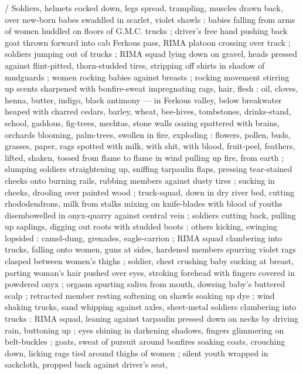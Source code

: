 {\slash} Soldiers, helmets cocked down, legs spread, trampling, muscles drawn back, 
    over new-born babes swaddled in scarlet, violet shawls 
: babies falling from arms of women huddled on floors of G.M.C. trucks 
; driver's free hand pushing back goat thrown forward into cab 
{\semislash} Ferkous pass, RIMA platoon crossing over track 
; soldiers jumping out of trucks 
; RIMA squad lying down on gravel, heads pressed against flint-pitted, 
    thorn-studded tires, stripping off shirts in shadow of mudguards 
; women rocking babies against breasts 
; rocking movement stirring up scents sharpened with bonfire-sweat impregnating rags, hair, flesh 
: oil, cloves, henna, butter, indigo, black antimony 
--- in Ferkous valley, below breakwater heaped with charred cedars, 
    barley, wheat, bee-hives, tombstones, drinks-stand, school, gaddous, fig-trees, mechtas, 
    stone walls oozing spattered with brains, orchards blooming, palm-trees, swollen in fire, 
    exploding 
: flowers, pollen, buds, grasses, paper, rags spotted with milk, with shit, with blood, fruit-peel, 
    feathers, lifted, shaken, tossed from flame to flame in wind pulling up fire, from earth 
; slumping soldiers straightening up, sniffing tarpaulin flaps, 
    pressing tear-stained cheeks onto burning rails, rubbing members against dusty tires 
; sucking in cheeks, drooling over painted wood 
; truck-squad, down in dry river bed, cutting rhododendrons, milk from stalks mixing on 
    knife-blades with blood of youths disembowelled in onyx-quarry against central vein 
; soldiers cutting back, pulling up saplings, digging out roots with studded boots 
; others kicking, swinging lopsided 
: camel-dung, grenades, eagle-carrion 
; RIMA squad clambering into trucks, falling onto women, guns at sides, hardened %
    members spurring violet rags clasped between women's thighs 
; soldier, chest crushing baby sucking at breast, parting woman's hair pushed over eyes, stroking 
    forehead with fingers covered in powdered onyx 
; orgasm spurting saliva from mouth, dowsing baby's buttered scalp 
; retracted member resting softening on shawls soaking up dye 
; wind shaking trucks, sand whipping against axles, sheet-metal
{\semislash} soldiers clambering into trucks 
: RIMA squad, leaning against tarpaulin pressed down on
necks by driving rain, buttoning up ; eyes shining in darkening shadows, fingers glimmering on
belt-buckles ; goats, sweat of pursuit around bonfires soaking coats, crouching down, licking rags
tied around thighs of women ; silent youth wrapped in sackcloth, propped back against driver's seat,
